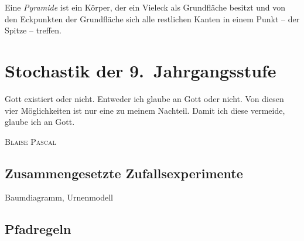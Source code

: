 \begin{defi}[Pyramide]
 Eine \emph{Pyramide} ist ein Körper, der ein Vieleck als Grundfläche besitzt und von den Eckpunkten der Grundfläche sich alle restlichen Kanten in einem Punkt -- der Spitze -- treffen.
\end{defi}

\begin{regel}
 
\end{regel}


\begin{regel}
 
\end{regel}

\begin{defi}[Kegel]
 
\end{defi}

\begin{regel}
 
\end{regel}


\begin{regel}
 
\end{regel}


\chapter{Stochastik der 9.~Jahrgangsstufe}

\epigraph{Gott existiert oder nicht. Entweder ich glaube an Gott oder nicht. Von diesen vier Möglichkeiten ist nur eine zu meinem Nachteil. Damit ich diese vermeide, glaube ich an Gott.}{\textsc{Blaise Pascal}}

\section{Zusammengesetzte Zufallsexperimente}
Baumdiagramm, Urnenmodell

\section{Pfadregeln}